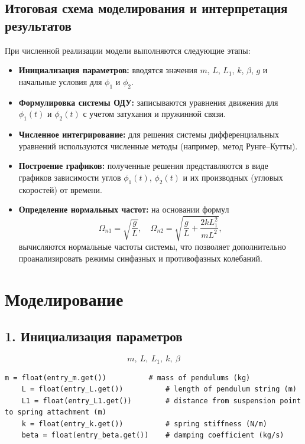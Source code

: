 \documentclass[a4paper,11pt]{article}
\theoremstyle{definition}
\begin{document}
\subsection*{Итоговая схема моделирования и интерпретация результатов}
При численной реализации модели выполняются следующие этапы:
\begin{itemize}
    \item \textbf{Инициализация параметров:} вводятся значения \(m\), \(L\), \(L_1\), \(k\), \(\beta\), \(g\) 
    и начальные условия для \(\phi_1\) и \(\phi_2\).
    \item \textbf{Формулировка системы ОДУ:} записываются уравнения движения для \(\phi_1(t)\) и \(\phi_2(t)\) 
    с учетом затухания и пружинной связи.
    \item \textbf{Численное интегрирование:} для решения системы дифференциальных уравнений используются 
    численные методы (например, метод Рунге--Кутты).
    \item \textbf{Построение графиков:} полученные решения представляются в виде графиков зависимости углов 
    \(\phi_1(t)\), \(\phi_2(t)\) и их производных (угловых скоростей) от времени.
    \item \textbf{Определение нормальных частот:} на основании формул
    \[
    \Omega_{n1}=\sqrt{\frac{g}{L}}, \quad \Omega_{n2}=\sqrt{\frac{g}{L}+\frac{2kL_1^2}{mL^2}},
    \]
    вычисляются нормальные частоты системы, что позволяет дополнительно проанализировать режимы синфазных 
    и противофазных колебаний.
\end{itemize}


\section*{Моделирование}

\subsection*{1. Инициализация параметров}
\begin{equation}
  m,\ L,\ L_1,\ k,\ \beta\label{eq:equation2}
\end{equation}

\begin{lstlisting}[language=MyPython,label={lst:lstlisting3}]
    m = float(entry_m.get())          # mass of pendulums (kg)
    L = float(entry_L.get())          # length of pendulum string (m)
    L1 = float(entry_L1.get())        # distance from suspension point to spring attachment (m)
    k = float(entry_k.get())          # spring stiffness (N/m)
    beta = float(entry_beta.get())    # damping coefficient (kg/s)
\end{lstlisting}
\end{document}

